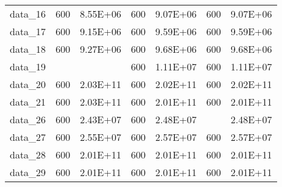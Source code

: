 \begin{table}[]
\begin{tabular}{lllllll}
data\_16 & 600                                     & 8.55E+06                                   & 600                                  & 9.07E+06                                & 600                                     & 9.07E+06                                    \\
data\_17 & 600                                     & 9.15E+06                                   & 600                                  & 9.59E+06                                & 600                                     & 9.59E+06                                    \\
data\_18 & 600                                     & 9.27E+06                                   & 600                                  & 9.68E+06                                & 600                                     & 9.68E+06                                    \\
data\_19 &                                         &                                            & 600                                  & 1.11E+07                                & 600                                     & 1.11E+07                                    \\
data\_20 & 600                                     & 2.03E+11                                   & 600                                  & 2.02E+11                                & 600                                     & 2.02E+11                                    \\
data\_21 & 600                                     & 2.03E+11                                   & 600                                  & 2.01E+11                                & 600                                     & 2.01E+11                                    \\
data\_26 & 600                                     & 2.43E+07                                   & 600                                  & 2.48E+07                                &                                         & 2.48E+07                                    \\
data\_27 & 600                                     & 2.55E+07                                   & 600                                  & 2.57E+07                                & 600                                     & 2.57E+07                                    \\
data\_28 & 600                                     & 2.01E+11                                   & 600                                  & 2.01E+11                                & 600                                     & 2.01E+11                                    \\
data\_29 & 600                                     & 2.01E+11                                   & 600                                  & 2.01E+11                                & 600                                     & 2.01E+11                                    \\ \hline
\end{tabular}
\end{table}